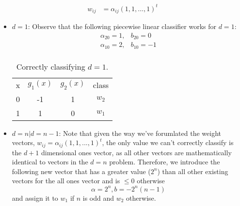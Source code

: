 \documentclass[12pt]{article}
\begin{document}
\begin{enumerate}
\begin{enumerate}
\begin{equation}
\begin{split}
w_{ij} &= \alpha_{ij}(1,1,...,1)^t
\end{split}
\end{equation}
\begin{itemize}
\item{$d=1$:} Observe that the following piecewise linear classifier works for $d=1$:
\begin{equation}
\begin{split}
\alpha_{20} = 1, &b_{20} = 0 \\
\alpha_{10} = 2, &b_{10} = -1 \\
\end{split}
\end{equation}
\begin{table}[H]
\centering
\begin{tabular}{cccc}
x & $g_1(x)$ & $g_2(x)$ & class \\
0 & -1 & 1 & $w_2$ \\
1 & 1 & 0 & $w_1$
\end{tabular}
\caption{Correctly classifying $d=1$.}
\end{table}
\item{$d=n|d=n-1$:} Note that given the way we've forumlated the weight vectors, $w_{ij} = \alpha_{ij}(1,1,...,1)^t$, the only value we can't correctly classify is the $d+1$ dimensional ones vector, as all other vectors are mathematically identical to vectors in the $d=n$ problem. Therefore, we introduce the following new vector that has a greater value ($2^n$) than all other existing vectors for the all ones vector and is $\leq 0$ otherwise
\begin{equation}
\alpha = 2^n, b = -2^n(n-1)
\end{equation}
and assign it to $w_1$ if $n$ is odd and $w_2$ otherwise.
\end{itemize}
\end{enumerate}
\end{enumerate}
\end{document}
